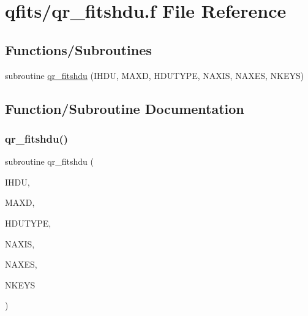 \hypertarget{qr__fitshdu_8f}{}\section{qfits/qr\+\_\+fitshdu.f File Reference}
\label{qr__fitshdu_8f}
\subsection*{Functions/\+Subroutines}
\begin{DoxyCompactItemize}
\item 
subroutine \hyperlink{qr__fitshdu_8f_a9f50e01d1c4b4c842571c7d763813187}{qr\+\_\+fitshdu} (I\+H\+DU, M\+A\+XD, H\+D\+U\+T\+Y\+PE, N\+A\+X\+IS, N\+A\+X\+ES, N\+K\+E\+YS)
\end{DoxyCompactItemize}


\subsection{Function/\+Subroutine Documentation}
\mbox{\label{qr__fitshdu_8f_a9f50e01d1c4b4c842571c7d763813187}} 
\subsubsection{\texorpdfstring{qr\+\_\+fitshdu()}{qr\_fitshdu()}}
{\footnotesize\ttfamily subroutine qr\+\_\+fitshdu (\begin{DoxyParamCaption}\item[{integer}]{I\+H\+DU,  }\item[{integer}]{M\+A\+XD,  }\item[{integer}]{H\+D\+U\+T\+Y\+PE,  }\item[{integer}]{N\+A\+X\+IS,  }\item[{integer, dimension(maxd)}]{N\+A\+X\+ES,  }\item[{integer}]{N\+K\+E\+YS }\end{DoxyParamCaption})}


